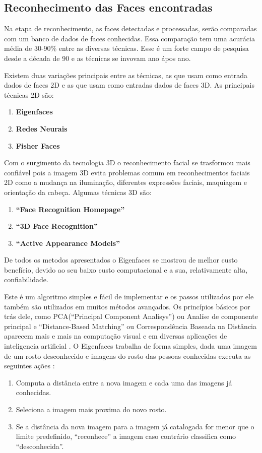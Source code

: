 
\subsection{Reconhecimento das Faces encontradas}

Na etapa de reconhecimento, as faces detectadas e processadas, serão comparadas com um banco de dados de faces conhecidas. Essa comparação tem uma acurácia média de 30-90\% entre as diversas técnicas. Esse é um forte campo de pesquisa desde a década de 90 e as técnicas se invovam ano ápos ano.

Existem duas variações principais entre as técnicas, as que usam como entrada dados de faces 2D e as que usam como entradas dados de faces 3D.
As principais técnicas 2D são:
	\begin{enumerate}
		\item \textbf{Eigenfaces}
		\item \textbf{Redes Neurais}
		\item \textbf{Fisher Faces}
	\end{enumerate}

Com o surgimento da tecnologia 3D o reconhecimento facial se trasformou mais confiável pois a imagem 3D evita problemas comum em reconhecimentos faciais 2D como a mudança na iluminação, diferentes expressões faciais, maquiagem e orientação da cabeça.
Algumas técnicas 3D são:
	\begin{enumerate}
		\item \textbf{``Face Recognition Homepage''}
		\item \textbf{``3D Face Recognition''}
		\item \textbf{``Active Appearance Models''}
	\end{enumerate}

De todos os metodos apresentados o Eigenfaces se mostrou de melhor custo benefício, devido ao seu baixo custo computacional e a sua, relativamente alta, confiabilidade.

Este é um algoritmo simples e fácil de implementar e os passos utilizados por ele também são utilizados em muitos métodos avançados. Os princípios básicos por trás dele, como PCA(``Principal Component Analisys'') ou Analíse de componente principal e ``Distance-Based Matching'' ou Correspondência Baseada na Distância aparecem mais e mais na computação visual e em diversas aplicações de inteligencia artificial \cite{hewitt}.
O Eigenfaces trabalha de forma simples, dada uma imagem de um rosto desconhecido e imagens do rosto das pessoas conhecidas executa as seguintes ações \cite{hewitt}:
	\begin{enumerate}
		\item Computa a distância entre a nova imagem e cada uma das imagens já conhecidas.
		\item Seleciona a imagem mais proxima do novo rosto.
		\item Se a distância da nova imagem para a imagem já catalogada for menor que o limite predefinido, ``reconhece'' a imagem caso contrário classifica como ``desconhecida''.
	\end{enumerate}


